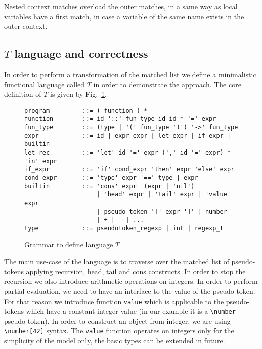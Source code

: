 Nested context matches overload the outer matches, in a same
way as local variables have a first match, in case a variable
of the same name exists in the outer context.


\subsection{$T$ language and correctness}
In order to perform a transformation of the matched list we define a
minimalistic functional language called $T$ in order to demonstrate
the approach.  The core definition of $T$ is given by Fig.~\ref{fig:t}.

\begin{figure}
\begin{verbatim}
program         ::= ( function ) *
function        ::= id '::' fun_type id id * '=' expr
fun_type        ::= (type | '(' fun_type ')') '->' fun_type
expr            ::= id | expr expr | let_expr | if_expr | builtin
let_rec         ::= 'let' id '=' expr (',' id '=' expr) * 'in' expr
if_expr         ::= 'if' cond_expr 'then' expr 'else' expr
cond_expr       ::= 'type' expr '==' type | expr
builtin         ::= 'cons' expr  (expr | 'nil') 
                    | 'head' expr | 'tail' expr | 'value' expr
                    | pseudo_token '[' expr ']' | number
                    | + | - | ...
type            ::= pseudotoken_regexp | int | regexp_t
\end{verbatim}
\caption{\label{fig:t}Grammar to define language $T$}
\end{figure}

The main use-case of the language is to traverse over the matched
list of pseudo-tokens applying recursion, head, tail and cons
constructs.  In order to stop the recursion we also introduce
arithmetic operations on integers.  In order to perform partial
evaluation, we need to have an interface to the value of the
pseudo-token.  For that reason we introduce function \verb|value|
which is applicable to the pseudo-tokens which have a constant
integer value (in our example it is a \verb|\number| pseudo-token).
In order to construct an object from integer, we are using
\verb|\number[42]| syntax.  The \verb|value| function operates
on integers only for the simplicity of the model only, the basic
types can be extended in future.

